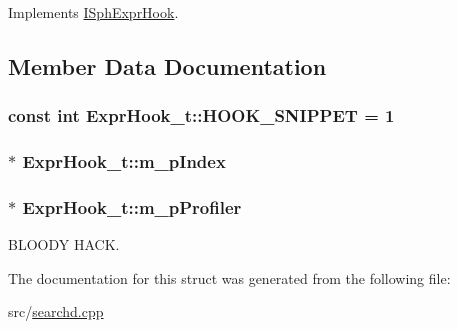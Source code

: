 Implements \hyperlink{structISphExprHook_aef2dae7cfa01dcae36195b6327bb37d9}{I\-Sph\-Expr\-Hook}.



\subsection{Member Data Documentation}
\hypertarget{structExprHook__t_aa2d11f3653b6b2c6cabf7068f9bb0047}{
\subsubsection[{H\-O\-O\-K\-\_\-\-S\-N\-I\-P\-P\-E\-T}]{\setlength{\rightskip}{0pt plus 5cm}const {\bf int} Expr\-Hook\-\_\-t\-::\-H\-O\-O\-K\-\_\-\-S\-N\-I\-P\-P\-E\-T = 1\hspace{0.3cm}{\ttfamily [static]}}}\label{structExprHook__t_aa2d11f3653b6b2c6cabf7068f9bb0047}
\hypertarget{structExprHook__t_abe356a529a6593053f1bbf9c0dfba8b4}{
\subsubsection[{m\-\_\-p\-Index}]{$\ast$ Expr\-Hook\-\_\-t\-::m\-\_\-p\-Index}}\label{structExprHook__t_abe356a529a6593053f1bbf9c0dfba8b4}
\hypertarget{structExprHook__t_a93dc9895e65e635e7831c6dcd5478311}{
\subsubsection[{m\-\_\-p\-Profiler}]{$\ast$ Expr\-Hook\-\_\-t\-::m\-\_\-p\-Profiler}}\label{structExprHook__t_a93dc9895e65e635e7831c6dcd5478311}


B\-L\-O\-O\-D\-Y H\-A\-C\-K. 



The documentation for this struct was generated from the following file\-:\begin{DoxyCompactItemize}
\item 
src/\hyperlink{searchd_8cpp}{searchd.\-cpp}\end{DoxyCompactItemize}
